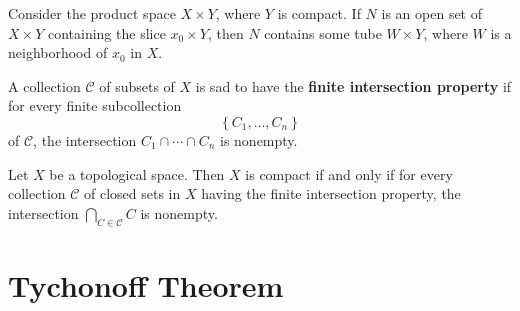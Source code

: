 \documentclass[12pt, a4paper, oneside]{book}
\begin{document}
\begin{lemma}
    Consider the product space $X \times Y$, where $Y$ is compact. If $N$ is an open set of $X \times Y$ containing the slice $x_0 \times Y$, then $N$ contains some tube $W \times Y$, where $W$ is a neighborhood of $x_0$ in $X$.
\end{lemma}






\begin{definition}
    A collection $\mathcal{C}$ of subsets of $X$ is sad to have the \textbf{finite intersection property} if for every finite subcollection
    \begin{equation*}
        \left\{C_1, \ldots, C_n\right\}
    \end{equation*}
    of $\mathcal{C}$, the intersection $C_1 \cap \cdots \cap C_n$ is nonempty.


\end{definition}



\begin{theorem}
    Let $X$ be a topological space. Then $X$ is compact if and only if for every collection $\mathcal{C}$ of closed sets in $X$ having the finite intersection property, the intersection $\bigcap_{C \in \mathcal{C}} C$  is nonempty.
\end{theorem}

\section{Tychonoff Theorem} %
\end{document}
